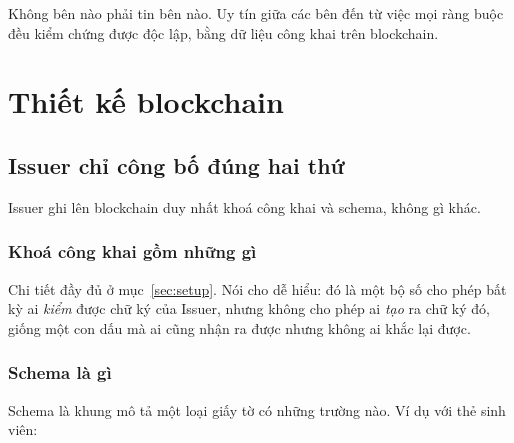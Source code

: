 \documentclass[a4paper,11pt,oneside]{report}
\theoremstyle{definition}
\theoremstyle{plain}
\begin{document}
Không bên nào phải tin bên nào. Uy tín giữa các bên đến từ việc mọi ràng buộc đều kiểm chứng được
độc lập, bằng dữ liệu công khai trên blockchain.

\chapter{Thiết kế blockchain}

\section{Issuer chỉ công bố đúng hai thứ}

Issuer ghi lên blockchain duy nhất khoá công khai và
schema, không gì khác.

\begin{center}
\end{center}

\subsection{Khoá công khai gồm những gì}

Chi tiết đầy đủ ở mục~\ref{sec:setup}. Nói cho dễ hiểu: đó là một bộ số cho phép bất kỳ ai
\emph{kiểm} được chữ ký của Issuer, nhưng không cho phép ai \emph{tạo} ra chữ ký đó, giống một
con dấu mà ai cũng nhận ra được nhưng không ai khắc lại được.

\subsection{Schema là gì}

Schema là khung mô tả một loại giấy tờ có những trường nào. Ví dụ với thẻ sinh viên:
\end{document}
